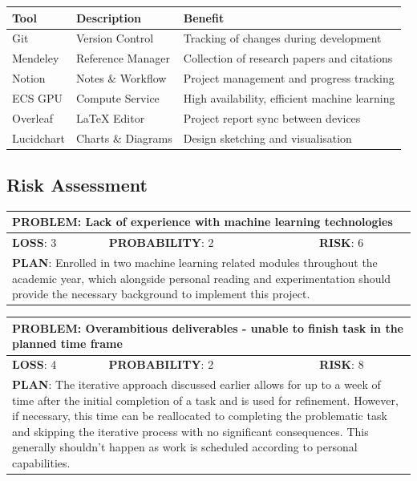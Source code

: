 \documentclass[a4paper,12pt]{article}
\begin{document}
\begin{tabular}{|l l l|} 
 \hline
 Tool & Description & Benefit \\ [0.3ex] 
 \hline\hline
 Git & Version Control & Tracking of changes during development \\ 
 \hline
 Mendeley & Reference Manager & Collection of research papers and citations \\
  \hline
 Notion & Notes \& Workflow & Project management and progress tracking \\
 \hline
 ECS GPU & Compute Service & High availability, efficient machine learning \\
 \hline
 Overleaf & LaTeX Editor & Project report sync between devices \\
 \hline
 Lucidchart & Charts \& Diagrams & Design sketching and visualisation \\
 \hline
\end{tabular}
\subsection{Risk Assessment}
\begin{tabular}{|l|l|l|}
\hline
\multicolumn{3}{|l|}{\parbox[t]{\textwidth-1.15cm}{\textbf{PROBLEM}: Lack of experience with machine learning technologies}} \\ \hline
\textbf{LOSS}: 3& \textbf{PROBABILITY}: 2&\textbf{RISK}: 6\\ \hline
\multicolumn{3}{|l|}{\parbox[t]{\textwidth-1.15cm}{\textbf{PLAN}: Enrolled in two machine learning related modules throughout the academic year, which alongside personal reading and experimentation should provide the necessary background to implement this project.}} \\ \hline
\end{tabular}

\begin{tabular}{|l|l|l|}
\hline
\multicolumn{3}{|l|}{\parbox[t]{\textwidth-1.15cm}{\textbf{PROBLEM}: Overambitious deliverables - unable to finish task in the planned time frame\vspace{.2\baselineskip}}} \\ \hline
\textbf{LOSS}: 4& \textbf{PROBABILITY}: 2&\textbf{RISK}: 8\\ \hline
\multicolumn{3}{|l|}{\parbox[t]{\textwidth-1.15cm}{\textbf{PLAN}: The iterative approach discussed earlier allows for up to a week of time after the initial completion of a task and is used for refinement. However, if necessary, this time can be reallocated to completing the problematic task and skipping the iterative process with no significant consequences. This generally shouldn't happen as work is scheduled according to personal capabilities.}} \\ \hline
\end{tabular}
\end{document}
